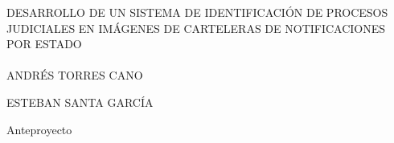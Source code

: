 \documentclass[letterpaper,12pt,oneside,pdftex]{icontec}
\begin{document}
\thispagestyle{empty}

\begin{center}

DESARROLLO DE UN SISTEMA DE IDENTIFICACI\'ON DE PROCESOS JUDICIALES EN IM\'AGENES DE CARTELERAS DE NOTIFICACIONES POR ESTADO
\end{center}
\paragraph{}

\paragraph{}

\paragraph{}

\paragraph{}
\begin{center}
ANDR\'ES TORRES CANO
\end{center}
\begin{center}
ESTEBAN SANTA GARC\'IA
\end{center}
\begin{center}
Anteproyecto
\end{center}

\paragraph{}
\paragraph{}
\paragraph{}


\paragraph{}

\paragraph{}

\paragraph{}
\end{document}
